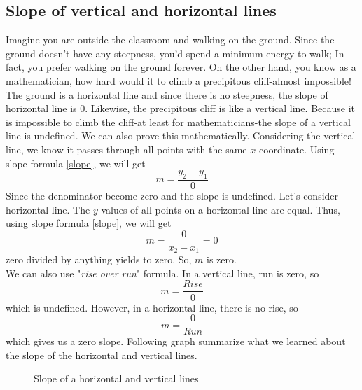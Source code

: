 \subsection{Slope of vertical and horizontal lines}
Imagine you are outside the classroom and walking on the ground. Since the ground doesn't have any steepness, you'd spend a minimum energy to walk; In fact, you prefer walking on the ground forever. On the other hand, you know as a mathematician, how hard would it to climb a precipitous cliff-almost impossible! \\
The ground is a horizontal line and since there is no steepness, the slope of horizontal line is 0. Likewise, the precipitous cliff is like a vertical line. Because it is impossible to climb the cliff-at least for mathematicians-the slope of a vertical line is undefined.
We can also prove this mathematically. Considering the vertical line, we know it passes through all points with the same $x$ coordinate. Using slope formula \eqref{slope}, we will get
\[
				m = \frac{y_2-y_1}{0}
\]
Since the denominator become zero and the slope is undefined. Let's consider horizontal line. The $y$ values of all points on a horizontal line are equal. Thus, using slope formula \eqref{slope}, we will get 
\[
				m = \frac{0}{x_2-x_1} =0
\]
zero divided by anything yields to zero. So, $m$ is zero.\\
We can also use "\textit{rise over run}" formula. In a vertical line, run is zero, so 
\[
						m=\frac{Rise}{0}
\]
which is undefined. However, in a horizontal line, there is no rise, 
so 
\[
						m=\frac{0}{Run}
\]
which gives us a zero slope.\newpage
Following graph summarize what we learned about the slope of the horizontal and vertical lines.
\begin{figure}[ht]
\centering
{}
	\caption{Slope of a horizontal and vertical lines}
\end{figure}
